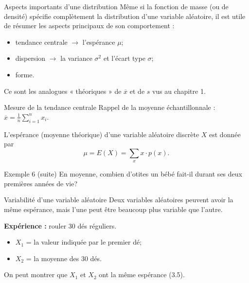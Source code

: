 \documentclass{BeamerTemplate}
\begin{document}
\begin{frame}[t]{Aspects importants d'une distribution}
  Même si la fonction de masse (ou de densité) spécifie complètement la
  distribution d'une variable aléatoire, il est utile de résumer les aspects
  principaux de son comportement :
  \begin{itemize}\itemsep 2mm
    \item \alert{tendance centrale} $\rightarrow$ l'espérance $\mu$;
    \item \alert{dispersion} $\rightarrow$ la variance $\sigma^2$ et l'écart type $\sigma$;
    \item forme.
  \end{itemize}

  \medskip
  Ce sont les analogues « théoriques » de $\overline{x}$ et de $s$ vus au
  chapitre 1.
\end{frame}

\begin{frame}[t]{Mesure de la tendance centrale}
  Rappel de la moyenne échantillonnale :
  $\displaystyle \overline{x} = \frac{1}{n} \sum_{i=1}^{n} x_i$.

  \begin{defn}
    L'\alert{espérance} (moyenne théorique) d'une variable aléatoire discrète
    $X$ est donnée par
    \[ \mu = E(X) = \sum_x x \cdot p(x). \]
  \end{defn}

\end{frame}

\begin{frame}[t]{Exemple 6 (suite)}
  En moyenne, combien d'otites un bébé fait-il durant ses deux premières
  années de vie?
\end{frame}

\begin{frame}[t]{Variabilité d'une variable aléatoire}
  Deux variables aléatoires peuvent avoir la même espérance, mais l'une peut
  être beaucoup plus variable que l'autre.

  \medskip
  \textbf{Expérience :} rouler 30 dés réguliers.
  \begin{itemize}
    \item $X_1$ = la valeur indiquée par le premier dé;
    \item $X_2$ = la moyenne des 30 dés.
  \end{itemize}

  \medskip
  On peut montrer que $X_1$ et $X_2$ ont la même espérance (3.5).

  \medskip
\end{frame}
\end{document}
